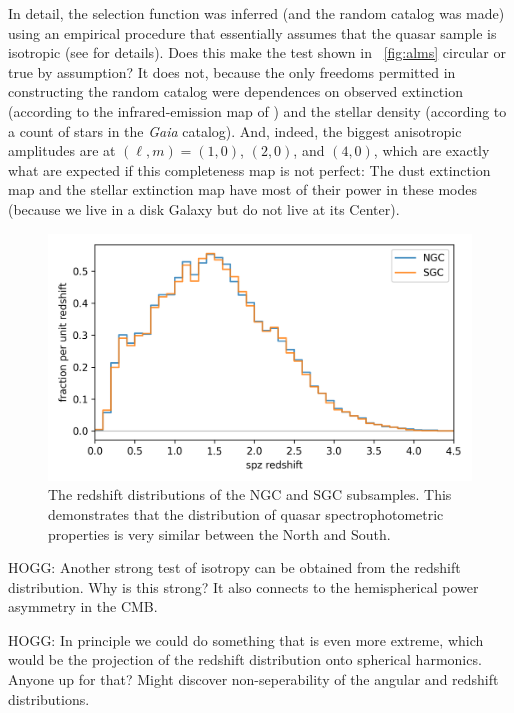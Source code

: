 \documentclass[modern]{aastex631}
\newlength{\figurewidth}
\newcommand{\figref}[1]{\figurename~\ref{#1}}
\begin{document}
In detail, the selection function was inferred (and the random catalog was made) using an empirical procedure that essentially assumes that the quasar sample is isotropic (see \citealt{ksf} for details).
Does this make the test shown in \figref{fig:alms} circular or true by assumption?
It does not, because the only freedoms permitted in constructing the random catalog were dependences on observed extinction (according to the infrared-emission map of \citealt{sfd}) and the stellar density (according to a count of stars in the \textsl{Gaia} catalog).
And, indeed, the biggest anisotropic amplitudes are at $(\ell,m)=(1,0)$, $(2,0)$, and $(4,0)$, which are exactly what are expected if this completeness map is not perfect:
The dust extinction map and the stellar extinction map have most of their power in these modes (because we live in a disk Galaxy but do not live at its Center).

\begin{figure}[t!]
  \begin{mdframed}
  \color{captiongray}
  \begin{center}
    \includegraphics[width=\figurewidth]{notebooks/zhist.png}
  \end{center}
    \caption{The redshift distributions of the NGC and SGC subsamples. This demonstrates that the distribution of quasar spectrophotometric properties is very similar between the North and South.\label{fig:zhist}}
  \end{mdframed}
\end{figure}
HOGG: Another strong test of isotropy can be obtained from the redshift distribution.
Why is this strong?
It also connects to the hemispherical power asymmetry in the CMB.

HOGG: In principle we could do something that is even more extreme, which would be the projection of the redshift distribution onto spherical harmonics. Anyone up for that? Might discover non-seperability of the angular and redshift distributions.
\end{document}
